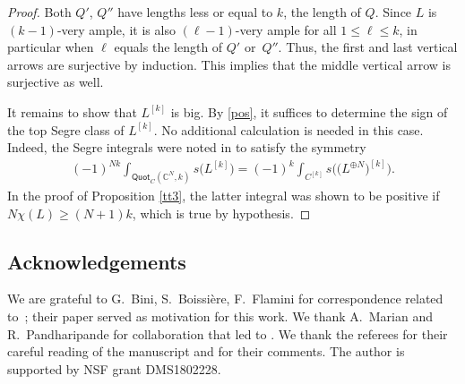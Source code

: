 \documentclass[pdftex]{sigma}
\numberwithin{equation}{section}
\begin{document}
\begin{proof}
Both $Q'$, $Q''$ have lengths less or equal to $k$, the length of $Q$. Since $L$ is $(k-1)$-very ample, it is also $(\ell-1)$-very ample for all $1\leq \ell\leq k$, in particular when $\ell$ equals the length of $Q'$ or~$Q''$. Thus, the first and last vertical arrows are surjective by induction. This implies that the middle vertical arrow is surjective as well.

It remains to show that $L^{[k]}$ is big. By \eqref{pos}, it suffices to determine the sign of the top Segre class of $L^{[k]}$. No additional calculation is needed in this case. Indeed, the Segre integrals were noted in \cite[Corollary~10]{OP2021} to satisfy the symmetry
\begin{gather*}
(-1)^{Nk} \int_{{\mathsf{Quot}}_C(\mathbb C^N, k)} s\big(L^{[k]}\big)=(-1)^k\int_{C^{[k]}} s\bigl(\big(L^{\oplus N}\big)^{[k]}\bigr).
\end{gather*}
In the proof of Proposition \ref{tt3}, the latter integral was shown to be positive if $N\chi (L)\geq (N+1)k$, which is true by hypothesis.
\end{proof}

\subsection*{Acknowledgements}

We are grateful to G.~Bini, S.~Boissi\`ere, F.~Flamini for correspondence related to~\cite{BBF}; their paper served as motivation for this work. We thank A.~Marian and R.~Pandharipande for collaboration that led to \cite{MOP2, MOP1, MOP, OP2021}. We thank the referees for their careful reading of the manuscript and for their comments. The author is supported by NSF grant DMS1802228.
\end{document}
